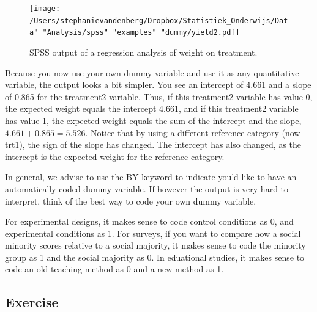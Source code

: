 \documentclass[]{report}\usepackage[]{graphicx}\usepackage[]{color}
\begin{document}
\begin{figure}[h]
    \begin{center}
       \texttt{[image: /Users/stephanievandenberg/Dropbox/Statistiek\_Onderwijs/Data" "Analysis/spss" "examples" "dummy/yield2.pdf]}
    \end{center}
 \caption{SPSS output of a regression analysis of weight on treatment.}
 \label{fig:dummy_11}
\end{figure}

Because you now use your own dummy variable and use it as any quantitative variable, the output looks a bit simpler. You see an intercept of 4.661 and a slope of 0.865 for the treatment2 variable. Thus, if this treatment2 variable has value 0, the expected weight equals the intercept 4.661, and if this treatment2 variable has value 1, the expected weight equals the sum of the intercept and the slope, $4.661 + 0.865 = 5.526$. Notice that by using a different reference category (now trt1), the sign of the slope has changed. The intercept has also changed, as the intercept is the expected weight for the reference category. 

In general, we advise to use the BY keyword to indicate you'd like to have an automatically coded dummy variable. If however the output is very hard to interpret, think of the best way to code your own dummy variable. 

For experimental designs, it makes sense to code control conditions as 0, and experimental conditions as 1. For surveys, if you want to compare how a social minority scores relative to a social majority, it makes sense to code the minority group as 1 and the social majority as 0. In eduational studies, it makes sense to code an old teaching method as 0 and a new method as 1.  

\subsection{Exercise}
\end{document}
